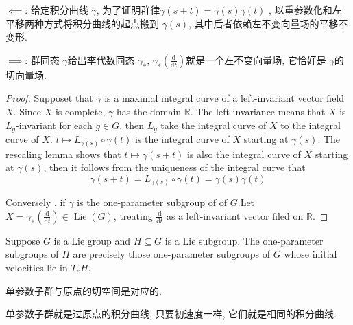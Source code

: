 \documentclass[../main.tex]{subfiles}
\begin{document}
\begin{proofsketch}
    \(  \impliedby    \): 给定积分曲线 \(   \gamma   \), 为了证明群律\(   \gamma \left( s+ t \right)=  \gamma \left( s \right) \gamma \left( t \right)     \)  , 以重参数化和左平移两种方式将积分曲线的起点搬到 \(   \gamma \left( s \right)   \), 其中后者依赖左不变向量场的平移不变形. 

    \(  \implies   \): 群同态 \(   \gamma   \)给出李代数同态 \(   \gamma _{*}  \),  \(   \gamma _{*}\left( \frac{\mathrm{d}}{\mathrm{d}t} \right)   \)就是一个左不变向量场, 它恰好是 \(   \gamma   \)的切向量场.     
\end{proofsketch}
\begin{proof}
    Supposet that \(   \gamma   \) is a maximal integral curve of a left-invariant vector field \(  X  \). Since \(  X  \) is complete, \(   \gamma   \) has the domain \(  \mathbb{R}   \). The left-invariance means that \(  X  \) is \(  L_{g}  \)-invariant for each \(  g\in G  \), then \(  L_{g}  \) take the integral curve  of \(  X  \) to the integral curve of \(  X  \).   \(  t\mapsto L_{ \gamma \left( s \right) }\circ  \gamma \left( t \right)   \) is the integral curve of \(  X  \) starting at \(   \gamma \left( s \right)   \). The rescaling lemma shows that  \(  t\mapsto  \gamma \left( s+ t  \right)   \)     is also the integral curve of \(  X  \) starting at \(   \gamma \left( s \right)   \), then it follows from the uniqueness of the integral curve that  \[
     \gamma \left( s+ t \right)= L_{ \gamma \left( s \right) }\circ \gamma \left( t \right)=  \gamma \left( s \right) \gamma \left( t \right)    
    \]  

    Conversely , if \(   \gamma   \) is the one-parameter subgroup of of \(  G  \).Let  \(X=   \gamma _{*}\left( \frac{\mathrm{d}}{\mathrm{d}t} \right)  \in \operatorname{Lie}\left( G \right)  \), treating \(  \frac{\mathrm{d}}{\mathrm{d}t}  \) as a left-invariant vector filed on \(  \mathbb{R}   \). 
\end{proof}
\begin{proposition}{}{} 
Suppose \(G\) is a Lie group and \(H \subseteq G\) is a Lie subgroup. The one-parameter subgroups of \(H\) are precisely those one-parameter subgroups of \(G\) whose initial velocities lie in \(T_eH\).
\end{proposition}

\begin{proofsketch}
    单参数子群与原点的切空间是对应的.


    单参数子群就是过原点的积分曲线, 只要初速度一样, 它们就是相同的积分曲线.
\end{proofsketch}
\end{document}
